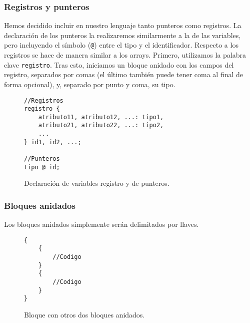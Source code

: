 \subsubsection{Registros y punteros}
Hemos decidido incluir en nuestro lenguaje tanto punteros como registros. La
declaración de los punteros la realizaremos similarmente a la de las variables,
pero incluyendo el símbolo (\lstinline{@}) entre el tipo y el identificador. Respecto a los
registros se hace de manera similar a los arrays. Primero, utilizamos la palabra clave \lstinline{registro}. Tras esto, iniciamos un bloque anidado
con los campos del registro, separados por comas (el último también
puede tener coma al final de forma opcional), y, separado por punto y coma, su tipo.
\begin{figure}[htbp]
    \centering
    \begin{lstlisting}
//Registros
registro {
    atributo11, atributo12, ...: tipo1,
    atributo21, atributo22, ...: tipo2,
    ...
} id1, id2, ...;

//Punteros
tipo @ id;
    \end{lstlisting}
    \caption{Declaración de variables registro y de punteros.}
\end{figure}

\subsubsection{Bloques anidados}
Los bloques anidados simplemente serán delimitados por llaves.
\begin{figure}[htbp]
    \centering
    \begin{lstlisting}
{
    {
        //Codigo
    }
    {
        //Codigo
    }
}
    \end{lstlisting}
    \caption{Bloque con otros dos bloques anidados.}
\end{figure}

